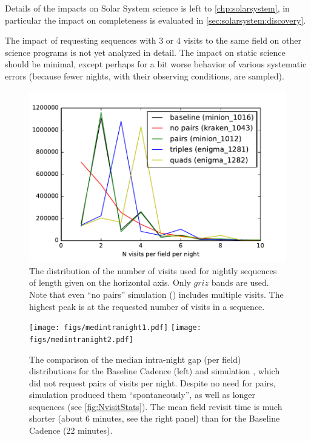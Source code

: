 Details of the impacts on Solar System science is
left to \autoref{chp:solarsystem}, in particular the impact on
completeness is evaluated in \autoref{sec:solarsystem:discovery}.

The impact of requesting sequences with 3 or 4 visits to the same
field on other science programs is not yet analyzed in detail.  The
impact on static science should be minimal, except perhaps for a bit
worse behavior of various systematic errors (because fewer nights,
with their observing conditions, are sampled).

\begin{figure}[t!]
\vskip -0.03in
\includegraphics[angle=0,width=0.99\hsize,clip]{figs/ptq/NvisitStats.pdf}
\vskip -0.2in
\caption{The distribution of the number of visits used for nightly sequences of
length given on the horizontal axis. Only $griz$ bands are used. Note that even
``no pairs'' simulation ()
includes multiple visits. The highest peak is at the
requested number of visits in a sequence.}
\label{fig:NvisitStats}
\end{figure}

\begin{figure}[t!]
\vskip -1.2in
\texttt{[image: figs/medintranight1.pdf]}
\texttt{[image: figs/medintranight2.pdf]}
\vskip -1.3in
\caption{%
The comparison of the median intra-night gap (per field) distributions for the
Baseline Cadence (left)
and simulation , which did not request pairs of visits per night.
Despite no need for pairs, simulation  produced them ``spontaneously'',
as well as longer sequences (see \autoref{fig:NvisitStats}). The mean field revisit
time is much shorter (about 6 minutes, see the right panel) than for the Baseline Cadence
(22 minutes).}
\label{fig:intranightgapCompare}
\end{figure}


